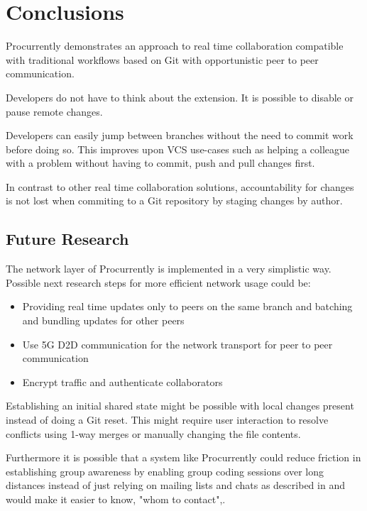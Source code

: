\chapter{Conclusions}

Procurrently demonstrates an approach to real time collaboration compatible with traditional workflows based on Git with opportunistic peer to peer communication. 

Developers do not have to think about the extension. It is possible to disable or pause remote changes. 

Developers can easily jump between branches without the need to commit work before doing so. This improves upon VCS use-cases such as helping a colleague with a problem without having to commit, push and pull changes first. 

In contrast to other real time collaboration solutions, accountability for changes is not lost when commiting to a Git repository by staging changes by author.

\section{Future Research}

The network layer of Procurrently is implemented in a very simplistic way.
Possible next research steps for more efficient network usage could be:

\begin{itemize}
    \item Providing real time updates only to peers on the same branch and batching and bundling updates for other peers
    \item Use 5G D2D communication for the network transport for peer to peer communication \cite{TehraniUysalYanikomeroglu:2014:Device-to-devicecommunicationin5G}
    \item Encrypt traffic and authenticate collaborators
\end{itemize}

Establishing an initial shared state might be possible with local changes present instead of doing a Git reset. This might require user interaction to resolve conflicts using 1-way merges or manually changing the file contents.\cite{7070484}

Furthermore it is possible that a system like Procurrently could reduce friction in establishing group awareness by enabling group coding sessions over long distances instead of just relying on mailing lists and chats as described in \cite{Gutwin:2004:GAD:1031607.1031621} and would make it easier to know, "whom to contact"\cite{795103},\cite{Gutwin:2004:GAD:1031607.1031621}.